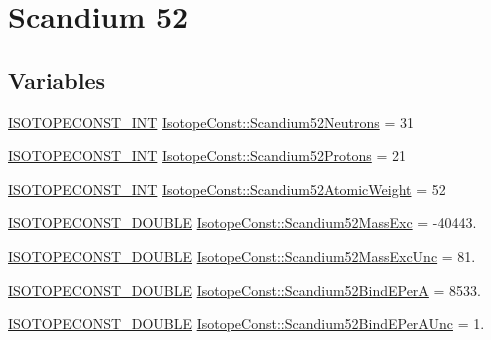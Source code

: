 \hypertarget{group___isotope_const-_scandium-_sc52}{}\section{Scandium 52}
\label{group___isotope_const-_scandium-_sc52}
\subsection*{Variables}
\begin{DoxyCompactItemize}
\item 
\mbox{\hyperlink{group___isotope_const-_macros_ga5f18360b3e99483a35c32d789e62621c}{I\+S\+O\+T\+O\+P\+E\+C\+O\+N\+S\+T\+\_\+\+I\+NT}} \mbox{\hyperlink{group___isotope_const-_scandium-_sc52_gaacc26cc2297fa3357f77abb01b103eb4}{Isotope\+Const\+::\+Scandium52\+Neutrons}} = 31
\item 
\mbox{\hyperlink{group___isotope_const-_macros_ga5f18360b3e99483a35c32d789e62621c}{I\+S\+O\+T\+O\+P\+E\+C\+O\+N\+S\+T\+\_\+\+I\+NT}} \mbox{\hyperlink{group___isotope_const-_scandium-_sc52_gaff25ba3e473c978f59677dc61e7ad5a7}{Isotope\+Const\+::\+Scandium52\+Protons}} = 21
\item 
\mbox{\hyperlink{group___isotope_const-_macros_ga5f18360b3e99483a35c32d789e62621c}{I\+S\+O\+T\+O\+P\+E\+C\+O\+N\+S\+T\+\_\+\+I\+NT}} \mbox{\hyperlink{group___isotope_const-_scandium-_sc52_ga114a5aaf6ad30c30a75cb1c6902eea9c}{Isotope\+Const\+::\+Scandium52\+Atomic\+Weight}} = 52
\item 
\mbox{\hyperlink{group___isotope_const-_macros_ga8f45a7272ce02c0b4c65c44636ed719a}{I\+S\+O\+T\+O\+P\+E\+C\+O\+N\+S\+T\+\_\+\+D\+O\+U\+B\+LE}} \mbox{\hyperlink{group___isotope_const-_scandium-_sc52_ga37c8fc3bccca3d8b7cbdc154c278579d}{Isotope\+Const\+::\+Scandium52\+Mass\+Exc}} = -\/40443.
\item 
\mbox{\hyperlink{group___isotope_const-_macros_ga8f45a7272ce02c0b4c65c44636ed719a}{I\+S\+O\+T\+O\+P\+E\+C\+O\+N\+S\+T\+\_\+\+D\+O\+U\+B\+LE}} \mbox{\hyperlink{group___isotope_const-_scandium-_sc52_gac31b007e53a7e8e8aa897493b3456b78}{Isotope\+Const\+::\+Scandium52\+Mass\+Exc\+Unc}} = 81.
\item 
\mbox{\hyperlink{group___isotope_const-_macros_ga8f45a7272ce02c0b4c65c44636ed719a}{I\+S\+O\+T\+O\+P\+E\+C\+O\+N\+S\+T\+\_\+\+D\+O\+U\+B\+LE}} \mbox{\hyperlink{group___isotope_const-_scandium-_sc52_ga6034be91f0ac0c88784a00c6a36d0e2f}{Isotope\+Const\+::\+Scandium52\+Bind\+E\+PerA}} = 8533.
\item 
\mbox{\hyperlink{group___isotope_const-_macros_ga8f45a7272ce02c0b4c65c44636ed719a}{I\+S\+O\+T\+O\+P\+E\+C\+O\+N\+S\+T\+\_\+\+D\+O\+U\+B\+LE}} \mbox{\hyperlink{group___isotope_const-_scandium-_sc52_gacfeac69faa6776babab71bd03615b1d0}{Isotope\+Const\+::\+Scandium52\+Bind\+E\+Per\+A\+Unc}} = 1.

\end{DoxyCompactItemize}
